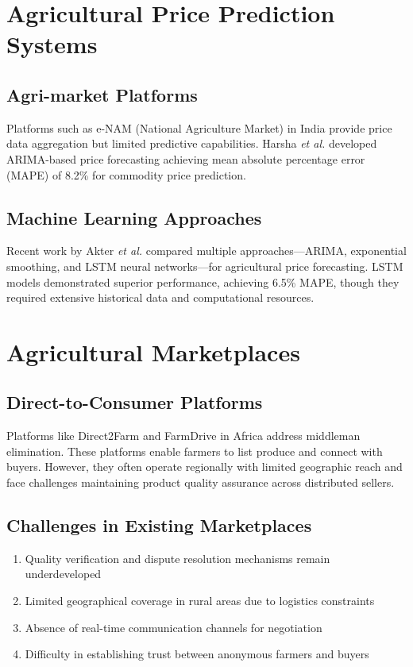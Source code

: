 \documentclass[12pt,a4paper]{report}
\begin{document}
\section{Agricultural Price Prediction Systems}

\subsection{Agri-market Platforms}

Platforms such as e-NAM (National Agriculture Market) in India provide price data aggregation but limited predictive capabilities. Harsha \textit{et al.} \cite{Harsha2020MarketIntellience} developed ARIMA-based price forecasting achieving mean absolute percentage error (MAPE) of 8.2\% for commodity price prediction.

\subsection{Machine Learning Approaches}

Recent work by Akter \textit{et al.} \cite{Akter2022PriceForecasting} compared multiple approaches---ARIMA, exponential smoothing, and LSTM neural networks---for agricultural price forecasting. LSTM models demonstrated superior performance, achieving 6.5\% MAPE, though they required extensive historical data and computational resources.

\section{Agricultural Marketplaces}

\subsection{Direct-to-Consumer Platforms}

Platforms like Direct2Farm and FarmDrive in Africa address middleman elimination. These platforms enable farmers to list produce and connect with buyers. However, they often operate regionally with limited geographic reach and face challenges maintaining product quality assurance across distributed sellers.

\subsection{Challenges in Existing Marketplaces}

\begin{enumerate}
    \item Quality verification and dispute resolution mechanisms remain underdeveloped
    \item Limited geographical coverage in rural areas due to logistics constraints
    \item Absence of real-time communication channels for negotiation
    \item Difficulty in establishing trust between anonymous farmers and buyers
\end{enumerate}
\end{document}
